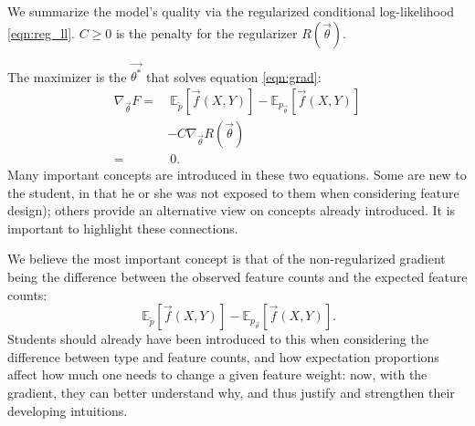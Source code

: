 \documentclass[11pt,letterpaper]{article}
\newcommand{\empirical}[0]{\ensuremath{\tilde{p}}}
\begin{document}
We summarize the model's quality via the regularized conditional
log-likelihood \eqref{eqn:reg_ll}.  $C \ge 0$ is the penalty for the
regularizer $R(\vec{\theta})$.

The maximizer is the $\vec{\theta^*}$ that solves equation \eqref{eqn:grad}:
\begin{equation}
\begin{aligned}
\nabla_{\vec{\theta}} F
 = &
\ \mathbb{E}_{\empirical{}}\left[\vec{f}(X,Y)\right] 
- \mathbb{E}_{{p_{\vec{\theta}}}}\left[\vec{f}(X,Y)\right]\\
 & - C \nabla_{\vec{\theta}}R(\vec{\theta})
\label{eqn:grad} \\
 = &\ 0.
\end{aligned}
\end{equation}
Many important concepts are introduced in these two equations. Some are new to the student, in that he or
she was not exposed to them when considering feature design); others provide an alternative view
on concepts already introduced. It is important to highlight these connections.

We believe the most important concept is that of the non-regularized gradient being the difference between the observed
feature counts and the expected feature counts:
\begin{equation}
\ \mathbb{E}_{\empirical{}}\left[\vec{f}(X,Y)\right] 
- \mathbb{E}_{p_{\vec{\theta}}}\left[\vec{f}(X,Y)\right].
\label{eqn:obsexp} 
\end{equation}
Students should already have been introduced to this when considering the difference between type and 
feature counts, and how expectation proportions affect how much one needs to change a given feature weight: 
now, with the gradient, they can better understand why, and thus justify and strengthen their developing intuitions.
\end{document}
